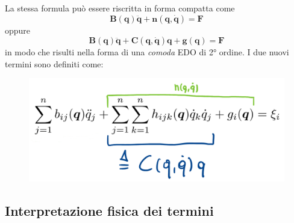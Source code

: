 La stessa formula può essere riscritta in forma compatta come
\begin{equation}\label{eq:robot_dynamics_short}
\boxed{
	\bm{B}(\bm{q})\bm{\ddot{q}} + \bm{n}(\bm{q}, \bm{\dot{q}}) = \mathcal{\bm{F}}
}
\end{equation}
oppure
\begin{equation}\label{eq:robot_dynamics_short2}
\boxed{
	\bm{B}(\bm{q})\bm{\ddot{q}} + \bm{C}(\bm{q}, \bm{\dot{q}})\bm{q} + \bm{g}(\bm{q})= \mathcal{\bm{F}}
}
\end{equation}
in modo che risulti nella forma di una \textit{comoda} EDO di 2° ordine. I due nuovi termini sono definiti come:
\begin{figure}[H]
	\centering
	\includegraphics[width=0.5\linewidth]{images/dynamics_2}
	\label{fig:dynamics2}
\end{figure}





\subsection{Interpretazione fisica dei termini}

